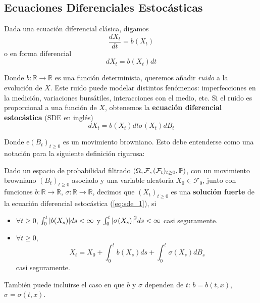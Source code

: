 % 

% 

\subsection{Ecuaciones Diferenciales Estocásticas}
Dada una ecuación diferencial clásica, digamos 
\begin{equation*}
        \frac{dX_t}{dt} = b(X_t)
\end{equation*}
o en forma diferencial 
\begin{equation*}
        dX_t = b(X_t) dt
\end{equation*}

Donde $b: \mathbb{R} \to \mathbb{R}$ es una función determinista, queremos añadir \textit{ruido} a la evolución 
de $X$. Este ruido puede modelar distintos fenómenos: imperfecciones en la medición, variaciones 
bursátiles, interacciones con el medio, etc. Si el ruido es proporcional a una función de $X$, obtenemos 
la \textbf{ecuación diferencial estocástica} (SDE en inglés)
\begin{equation*}
        \label{eq:sde_1}
        \tag{*}
        dX_t = b(X_t) dt \sigma (X_t) dB_t
\end{equation*}

Donde e$(B_t)_{t \ge  0}$ es un movimiento browniano. Esto debe entenderse como una notación para 
la siguiente definición rigurosa:
 \begin{definition}
         Dado un espacio de probabilidad filtrado $(\Omega, \mathcal{F},(\mathcal{F}_t)_{t \geq 0}, \P)$, 
         con un movimiento browniano $(B_t)_{t \ge 0}$ asociado y una variable
         aleatoria $X_0 \in \mathcal{F}_0$, junto con funciones $b: \mathbb{R} \to \mathbb{R}$, $\sigma: \mathbb{R} \to \mathbb{R}$, 
         decimos que $(X_t)_{t \ge 0}$ es una \textbf{solución fuerte} de la ecuación diferencial estocástica
         (\ref{eq:sde_1}), si 
         \begin{itemize}
                 \item $\forall  t \ge  0$, $\int_{0}^{t} \abs{b(X_s)} ds < \infty$ y 
                         $\int_{0}^{t} \abs{\sigma (X_s)}^2 ds < \infty$ casi seguramente.
                 \item $\forall  t \ge 0$,
                         \begin{equation*}
                                 \label{eq:sde_2}
                                 \tag{**}
                                 X_t = X_0 + \int_{0}^{t} b(X_s) ds  + \int_{0}^{t} \sigma (X_s) dB_s 
                         \end{equation*}
                         casi seguramente. 
         \end{itemize}
 \end{definition}
\begin{remark}
        También puede incluirse el caso en que $b$ y $\sigma$ dependen de $t$: $b = b(t,x)$, 
        $\sigma = \sigma(t,x)$. 
\end{remark}


